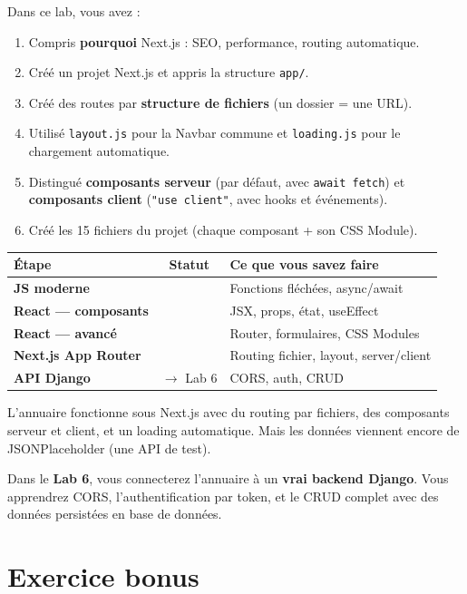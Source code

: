 \documentclass[11pt,a4paper]{article}
\newcommand{\cmark}{\ding{51}}
\begin{document}
Dans ce lab, vous avez :
\begin{enumerate}[nosep]
\item Compris \textbf{pourquoi} Next.js : SEO, performance, routing automatique.
\item Créé un projet Next.js et appris la structure \texttt{app/}.
\item Créé des routes par \textbf{structure de fichiers} (un dossier = une URL).
\item Utilisé \texttt{layout.js} pour la Navbar commune et \texttt{loading.js} pour le chargement automatique.
\item Distingué \textbf{composants serveur} (par défaut, avec \texttt{await fetch}) et \textbf{composants client} (\texttt{"use client"}, avec hooks et événements).
\item Créé les 15 fichiers du projet (chaque composant + son CSS Module).
\end{enumerate}

\begin{center}
\begin{tabular}{lcp{6.5cm}}
\toprule
\textbf{Étape} & \textbf{Statut} & \textbf{Ce que vous savez faire} \\
\midrule
\textbf{JS moderne} & \cmark{} & Fonctions fléchées, async/await \\
\textbf{React --- composants} & \cmark{} & JSX, props, état, useEffect \\
\textbf{React --- avancé} & \cmark{} & Router, formulaires, CSS Modules \\
\textbf{Next.js App Router} & \cmark{} & Routing fichier, layout, server/client \\
\textbf{API Django} & $\to$ Lab 6 & CORS, auth, CRUD \\
\bottomrule
\end{tabular}
\end{center}

\begin{projetbox}[Et ensuite ?]
L'annuaire fonctionne sous Next.js avec du routing par fichiers, des composants serveur et client, et un loading automatique. Mais les données viennent encore de JSONPlaceholder (une API de test).

Dans le \textbf{Lab 6}, vous connecterez l'annuaire à un \textbf{vrai backend Django}. Vous apprendrez CORS, l'authentification par token, et le CRUD complet avec des données persistées en base de données.
\end{projetbox}

\section*{Exercice bonus}
\end{document}
